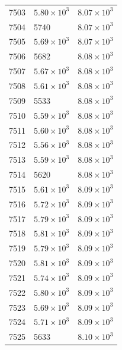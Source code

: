 \begin{table}[H]
\begin{tabular}{lll}
7503 & $\displaystyle 5.80 \times 10^{3}$ & $\displaystyle 8.07 \times 10^{3}$ \\
7504 & 5740 & $\displaystyle 8.07 \times 10^{3}$ \\
7505 & $\displaystyle 5.69 \times 10^{3}$ & $\displaystyle 8.07 \times 10^{3}$ \\
7506 & 5682 & $\displaystyle 8.08 \times 10^{3}$ \\
7507 & $\displaystyle 5.67 \times 10^{3}$ & $\displaystyle 8.08 \times 10^{3}$ \\
7508 & $\displaystyle 5.61 \times 10^{3}$ & $\displaystyle 8.08 \times 10^{3}$ \\
7509 & 5533 & $\displaystyle 8.08 \times 10^{3}$ \\
7510 & $\displaystyle 5.59 \times 10^{3}$ & $\displaystyle 8.08 \times 10^{3}$ \\
7511 & $\displaystyle 5.60 \times 10^{3}$ & $\displaystyle 8.08 \times 10^{3}$ \\
7512 & $\displaystyle 5.56 \times 10^{3}$ & $\displaystyle 8.08 \times 10^{3}$ \\
7513 & $\displaystyle 5.59 \times 10^{3}$ & $\displaystyle 8.08 \times 10^{3}$ \\
7514 & 5620 & $\displaystyle 8.08 \times 10^{3}$ \\
7515 & $\displaystyle 5.61 \times 10^{3}$ & $\displaystyle 8.09 \times 10^{3}$ \\
7516 & $\displaystyle 5.72 \times 10^{3}$ & $\displaystyle 8.09 \times 10^{3}$ \\
7517 & $\displaystyle 5.79 \times 10^{3}$ & $\displaystyle 8.09 \times 10^{3}$ \\
7518 & $\displaystyle 5.81 \times 10^{3}$ & $\displaystyle 8.09 \times 10^{3}$ \\
7519 & $\displaystyle 5.79 \times 10^{3}$ & $\displaystyle 8.09 \times 10^{3}$ \\
7520 & $\displaystyle 5.81 \times 10^{3}$ & $\displaystyle 8.09 \times 10^{3}$ \\
7521 & $\displaystyle 5.74 \times 10^{3}$ & $\displaystyle 8.09 \times 10^{3}$ \\
7522 & $\displaystyle 5.80 \times 10^{3}$ & $\displaystyle 8.09 \times 10^{3}$ \\
7523 & $\displaystyle 5.69 \times 10^{3}$ & $\displaystyle 8.09 \times 10^{3}$ \\
7524 & $\displaystyle 5.71 \times 10^{3}$ & $\displaystyle 8.09 \times 10^{3}$ \\
7525 & 5633 & $\displaystyle 8.10 \times 10^{3}$ \\

\end{tabular}
\end{table}
